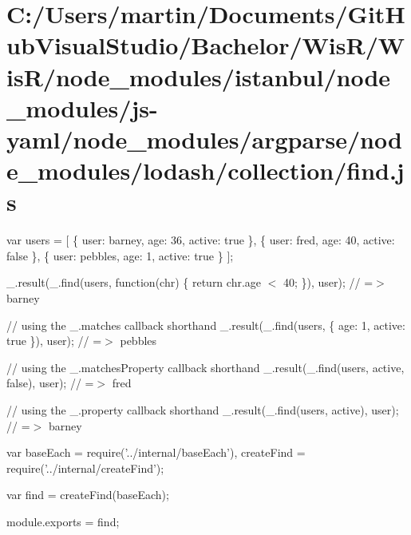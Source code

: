 \hypertarget{_c_1_2_users_2martin_2_documents_2_git_hub_visual_studio_2_bachelor_2_wis_r_2_wis_r_2node_module80ef4f68e2bb1b3612825fa0b9a80986}{}\section{C\+:/\+Users/martin/\+Documents/\+Git\+Hub\+Visual\+Studio/\+Bachelor/\+Wis\+R/\+Wis\+R/node\+\_\+modules/istanbul/node\+\_\+modules/js-\/yaml/node\+\_\+modules/argparse/node\+\_\+modules/lodash/collection/find.\+js}
var users = \mbox{[} \{ \textquotesingle{}user\textquotesingle{}\+: \textquotesingle{}barney\textquotesingle{}, \textquotesingle{}age\textquotesingle{}\+: 36, \textquotesingle{}active\textquotesingle{}\+: true \}, \{ \textquotesingle{}user\textquotesingle{}\+: \textquotesingle{}fred\textquotesingle{}, \textquotesingle{}age\textquotesingle{}\+: 40, \textquotesingle{}active\textquotesingle{}\+: false \}, \{ \textquotesingle{}user\textquotesingle{}\+: \textquotesingle{}pebbles\textquotesingle{}, \textquotesingle{}age\textquotesingle{}\+: 1, \textquotesingle{}active\textquotesingle{}\+: true \} \mbox{]};

\+\_\+.\+result(\+\_\+.\+find(users, function(chr) \{ return chr.\+age $<$ 40; \}), \textquotesingle{}user\textquotesingle{}); // =$>$ \textquotesingle{}barney\textquotesingle{}

// using the {\ttfamily \+\_\+.\+matches} callback shorthand \+\_\+.\+result(\+\_\+.\+find(users, \{ \textquotesingle{}age\textquotesingle{}\+: 1, \textquotesingle{}active\textquotesingle{}\+: true \}), \textquotesingle{}user\textquotesingle{}); // =$>$ \textquotesingle{}pebbles\textquotesingle{}

// using the {\ttfamily \+\_\+.\+matches\+Property} callback shorthand \+\_\+.\+result(\+\_\+.\+find(users, \textquotesingle{}active\textquotesingle{}, false), \textquotesingle{}user\textquotesingle{}); // =$>$ \textquotesingle{}fred\textquotesingle{}

// using the {\ttfamily \+\_\+.\+property} callback shorthand \+\_\+.\+result(\+\_\+.\+find(users, \textquotesingle{}active\textquotesingle{}), \textquotesingle{}user\textquotesingle{}); // =$>$ \textquotesingle{}barney\textquotesingle{}


\begin{DoxyCodeInclude}
var baseEach = require(\textcolor{stringliteral}{'../internal/baseEach'}),
    createFind = require(\textcolor{stringliteral}{'../internal/createFind'});

var find = createFind(baseEach);

module.exports = find;
\end{DoxyCodeInclude}
 